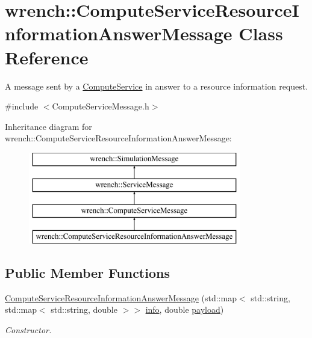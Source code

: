 \hypertarget{classwrench_1_1_compute_service_resource_information_answer_message}{}\section{wrench\+:\+:Compute\+Service\+Resource\+Information\+Answer\+Message Class Reference}
\label{classwrench_1_1_compute_service_resource_information_answer_message}


A message sent by a \hyperlink{classwrench_1_1_compute_service}{Compute\+Service} in answer to a resource information request.  




{\ttfamily \#include $<$Compute\+Service\+Message.\+h$>$}

Inheritance diagram for wrench\+:\+:Compute\+Service\+Resource\+Information\+Answer\+Message\+:\begin{figure}[H]
\begin{center}
\leavevmode
\includegraphics[height=4.000000cm]{classwrench_1_1_compute_service_resource_information_answer_message}
\end{center}
\end{figure}
\subsection*{Public Member Functions}
\begin{DoxyCompactItemize}
\item 
\hyperlink{classwrench_1_1_compute_service_resource_information_answer_message_a971d9d17b936818b5ec1fa7c85e9cb96}{Compute\+Service\+Resource\+Information\+Answer\+Message} (std\+::map$<$ std\+::string, std\+::map$<$ std\+::string, double $>$$>$ \hyperlink{classwrench_1_1_compute_service_resource_information_answer_message_a5fb24a3f72650e6edcc24faece988660}{info}, double \hyperlink{classwrench_1_1_simulation_message_a914f2732713f7c02898e66f05a7cb8a1}{payload})
\begin{DoxyCompactList}\small\item\em Constructor. \end{DoxyCompactList}\end{DoxyCompactItemize}
